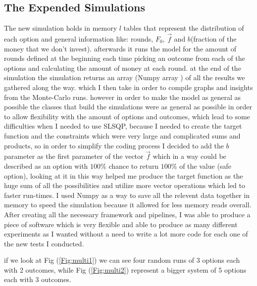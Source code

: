 \documentclass{article}
\begin{document}
	\subsection{The Expended Simulations}
	The new simulation holds in memory $l$ tables that represent the distribution of each option and general information like: rounds, $F_0$, $\overrightarrow{f}$ and $b$(fraction of the money that we don't invest). afterwards it runs the model for the amount of rounds defined at the beginning each time picking an outcome from each of the options and calculating the amount of money at each round. at the end of the simulation the simulation returns an array (Numpy array \cite{Numpy}) of all the results we gathered along the way.
	which I then take in order to compile graphs and insights from the Monte-Carlo runs.
	however in order to make the model as general as possible the classes that build the simulations were as general as possible in order to allow flexibility with the amount of options and outcomes, which lead to some difficulties when I needed to use SLSQP, because I needed to create the target function and the constraints which were very large and complicated sums and products, so in order to simplify the coding process I decided to add the $b$ parameter as the first parameter of the vector $\overrightarrow{f}$ which in a way could be described as an option with $100\%$ chance to return $100\%$ of the value (safe option), looking at it in this way helped me produce the target function as the huge sum of all the possibilities and utilize more vector operations which led to faster run-times. I used Numpy as a way to save all the relevent data together in memory to speed the simulation because it allowed for less memory reads overall.\newline
	After creating all the necessary framework and pipelines, I was able to produce a piece of software which is very flexible and able to produce as many different experiments as I wanted without a need to write a lot more code for each one of the new tests I conducted.\newline
	
	if we look at Fig (\ref{Fig:multi1}) we can see four random runs of 3 options each with 2 outcomes, while Fig (\ref{Fig:multi2}) represent a bigger system of 5 options each with 3 outcomes.
	
\end{document}
